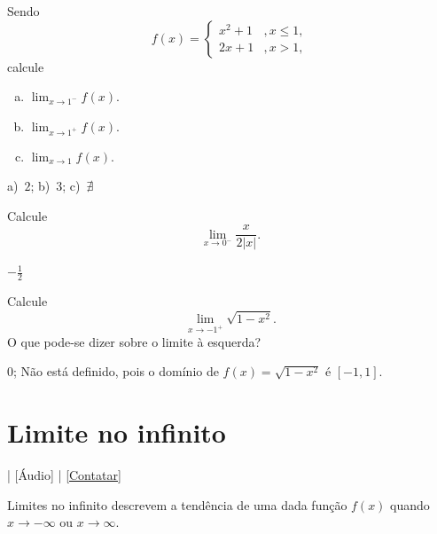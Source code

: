 \begin{exer}
  Sendo
  \begin{equation}
    f(x) = \left\{
      \begin{array}{ll}
        x^2+1 &, x\leq 1,\\
        2x+1 &, x>1,
      \end{array}
    \right.
  \end{equation}
  calcule
  \begin{enumerate}[a)]
  \item $\displaystyle \lim_{x\to 1^-} f(x)$.
  \item $\displaystyle \lim_{x\to 1^+} f(x)$.
  \item $\displaystyle \lim_{x\to 1} f(x)$.
  \end{enumerate}
\end{exer}
\begin{resp}
  a)~$2$; b)~$3$; c)~$\nexists$
\end{resp}

\begin{exer}
  Calcule
  \begin{equation}
    \lim_{x\to 0^-} \frac{x}{2|x|}.
  \end{equation}
\end{exer}
\begin{resp}
  $-\frac{1}{2}$
\end{resp}

\begin{exer}
  Calcule
  \begin{equation}
    \lim_{x\to -1^+} \sqrt{1-x^2}.
  \end{equation}
  O que pode-se dizer sobre o limite à esquerda?
\end{exer}
\begin{resp}
  $0$; Não está definido, pois o domínio de $f(x)=\sqrt{1-x^2}$ é $[-1, 1]$.
\end{resp}

\section{Limite no infinito}\label{cap_lim_sec_liminf}

\begin{flushright}
  [Vídeo] | [Áudio] | \href{https://phkonzen.github.io/notas/contato.html}{[Contatar]}
\end{flushright}

Limites no infinito descrevem a tendência de uma dada função $f(x)$ quando $x\to -\infty$ ou $x\to\infty$.

